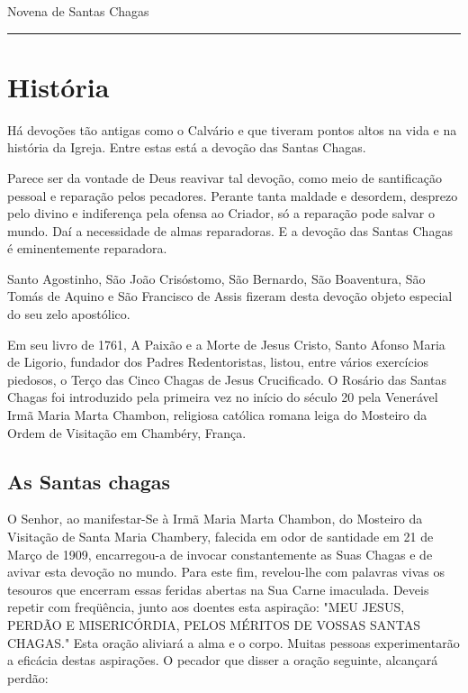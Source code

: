 \documentclass[a4paper,14pt]{extarticle} \usepackage[utf8]{inputenc}
\begin{document}


\begin{center}
	{\huge Novena de Santas Chagas}
\end{center}



\noindent\rule{\textwidth}{0.4pt}

\tableofcontents

\thispagestyle{empty}


\newpage

\section{História}

Há devoções tão antigas como o Calvário e que tiveram pontos altos na vida e na história da Igreja. Entre estas está a devoção das Santas Chagas.

Parece ser da vontade de Deus reavivar tal devoção, como meio de santificação pessoal e reparação pelos pecadores. Perante tanta maldade e desordem, desprezo pelo divino e indiferença pela ofensa ao Criador, só a reparação pode salvar o mundo. Daí a necessidade de almas reparadoras. E a devoção das Santas Chagas é eminentemente reparadora.

Santo Agostinho, São João Crisóstomo, São Bernardo, São Boaventura, São Tomás de Aquino e São Francisco de Assis fizeram desta devoção objeto especial do seu zelo apostólico.

Em seu livro de 1761, A Paixão e a Morte de Jesus Cristo, Santo Afonso Maria de Ligorio, fundador dos Padres Redentoristas, listou, entre vários exercícios piedosos, o Terço das Cinco Chagas de Jesus Crucificado. O Rosário das Santas Chagas foi introduzido pela primeira vez no início do século 20 pela Venerável Irmã Maria Marta Chambon, religiosa católica romana leiga do Mosteiro da Ordem de Visitação em Chambéry, França.


\subsection{As Santas chagas}

O Senhor, ao manifestar-Se à Irmã Maria Marta Chambon, do Mosteiro da Visitação de Santa Maria Chambery, falecida em odor de santidade em 21 de Março de 1909, encarregou-a de invocar constantemente as Suas Chagas e de avivar esta devoção no mundo. Para este fim, revelou-lhe com palavras vivas os tesouros que encerram essas feridas abertas na Sua Carne imaculada.
Deveis repetir com freqüência, junto aos doentes esta aspiração: "MEU JESUS, PERDÃO E MISERICÓRDIA, PELOS MÉRITOS DE VOSSAS SANTAS CHAGAS." Esta oração aliviará a alma e o corpo. Muitas pessoas experimentarão a eficácia destas aspirações.
O pecador que disser a oração seguinte, alcançará perdão: 
\newpage
\end{document}
